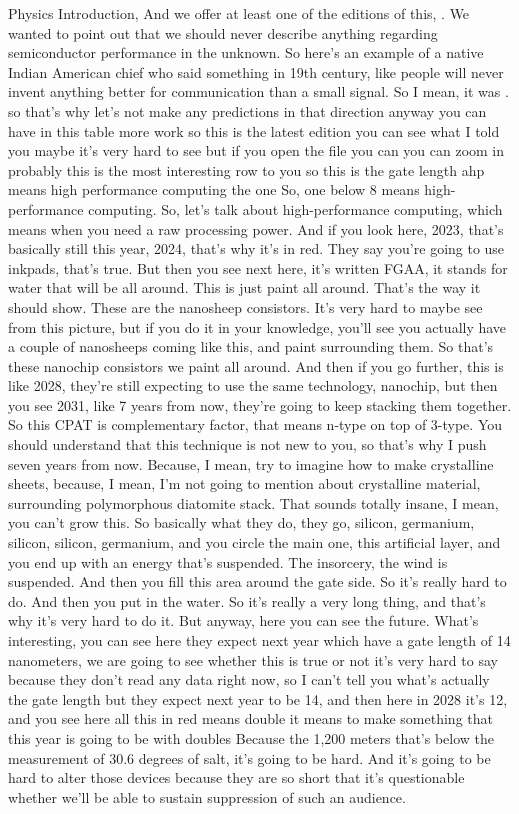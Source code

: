 Physics Introduction, And we offer at least one of the editions of this, . We wanted to point out that we should never describe anything regarding semiconductor performance in the unknown. So here's an example of a native Indian American chief who said something in 19th century, like people will never invent anything better for communication than a small signal. So I mean, it was . so that's why let's not make any predictions in that direction anyway you can have in this table more work so this is the latest edition you can see what I told you maybe it's very hard to see but if you open the file you can you can zoom in probably this is the most interesting row to you so this is the gate length ahp means high performance computing the one So, one below 8 means high-performance computing. So, let's talk about high-performance computing, which means when you need a raw processing power. And if you look here, 2023, that's basically still this year, 2024, that's why it's in red. They say you're going to use inkpads, that's true. But then you see next here, it's written FGAA, it stands for water that will be all around. This is just paint all around. That's the way it should show. These are the nanosheep consistors. It's very hard to maybe see from this picture, but if you do it in your knowledge, you'll see you actually have a couple of nanosheeps coming like this, and paint surrounding them. So that's these nanochip consistors we paint all around. And then if you go further, this is like 2028, they're still expecting to use the same technology, nanochip, but then you see 2031, like 7 years from now, they're going to keep stacking them together. So this CPAT is complementary factor, that means n-type on top of 3-type. You should understand that this technique is not new to you, so that's why I push seven years from now. Because, I mean, try to imagine how to make crystalline sheets, because, I mean, I'm not going to mention about crystalline material, surrounding polymorphous diatomite stack. That sounds totally insane, I mean, you can't grow this. So basically what they do, they go, silicon, germanium, silicon, silicon, germanium, and you circle the main one, this artificial layer, and you end up with an energy that's suspended. The insorcery, the wind is suspended. And then you fill this area around the gate side. So it's really hard to do. And then you put in the water. So it's really a very long thing, and that's why it's very hard to do it. But anyway, here you can see the future. What's interesting, you can see here they expect next year which have a gate length of 14 nanometers, we are going to see whether this is true or not it's very hard to say because they don't read any data right now, so I can't tell you what's actually the gate length but they expect next year to be 14, and then here in 2028 it's 12, and you see here all this in red means double it means to make something that this year is going to be with doubles Because the 1,200 meters that's below the measurement of 30.6 degrees of salt, it's going to be hard. And it's going to be hard to alter those devices because they are so short that it's questionable whether we'll be able to sustain suppression of such an audience.

